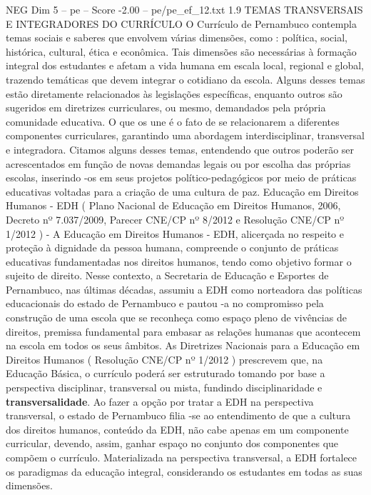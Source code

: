 \begin{textsample}{NEG Dim 5 – pe – Score -2.00 – pe/pe\_ef\_12.txt}  \label{ex:f5_neg_083}
1.9 TEMAS TRANSVERSAIS E INTEGRADORES DO CURRÍCULO O Currículo de Pernambuco contempla temas sociais e saberes que envolvem várias dimensões, como : política, social, histórica, cultural, ética e econômica.
Tais dimensões são necessárias à formação integral dos estudantes e afetam a vida humana em escala local, regional e global, trazendo temáticas que devem integrar o cotidiano da escola.
Alguns desses temas estão diretamente relacionados às legislações específicas, enquanto outros são sugeridos em diretrizes curriculares, ou mesmo, demandados pela própria comunidade educativa.
O que os une é o fato de se relacionarem a diferentes componentes curriculares, garantindo uma abordagem interdisciplinar, transversal e integradora.
Citamos alguns desses temas, entendendo que outros poderão ser acrescentados em função de novas demandas legais ou por escolha das próprias escolas, inserindo -os em seus projetos político-pedagógicos por meio de práticas educativas voltadas para a criação de uma cultura de paz.
Educação em Direitos Humanos - EDH ( Plano Nacional de Educação em Direitos Humanos, 2006, Decreto nº 7.037/2009, Parecer CNE/CP nº 8/2012 e Resolução CNE/CP nº 1/2012 ) - A Educação em Direitos Humanos - EDH, alicerçada no respeito e proteção à dignidade da pessoa humana, compreende o conjunto de práticas educativas fundamentadas nos direitos humanos, tendo como objetivo formar o sujeito de direito.
Nesse contexto, a Secretaria de Educação e Esportes de Pernambuco, nas últimas décadas, assumiu a EDH como norteadora das políticas educacionais do estado de Pernambuco e pautou -a no compromisso pela construção de uma escola que se reconheça como espaço pleno de vivências de direitos, premissa fundamental para embasar as relações humanas que acontecem na escola em todos os seus âmbitos.
As Diretrizes Nacionais para a Educação em Direitos Humanos ( Resolução CNE/CP nº 1/2012 ) prescrevem que, na Educação Básica, o currículo poderá ser estruturado tomando por base a perspectiva disciplinar, transversal ou mista, fundindo disciplinaridade e \textbf{transversalidade}.
Ao fazer a opção por tratar a EDH na perspectiva transversal, o estado de Pernambuco filia -se ao entendimento de que a cultura dos direitos humanos, conteúdo da EDH, não cabe apenas em um componente curricular, devendo, assim, ganhar espaço no conjunto dos componentes que compõem o currículo.
Materializada na perspectiva transversal, a EDH fortalece os paradigmas da educação integral, considerando os estudantes em todas as suas dimensões.

\end{textsample}
